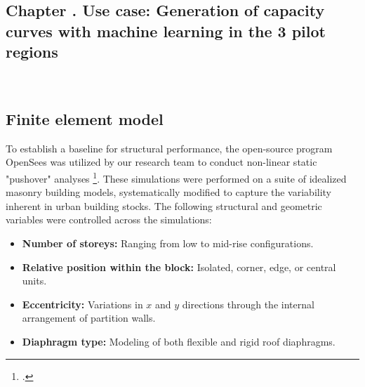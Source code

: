 \graphicspath{
    {figures_and_references/fragility_curves/}
    {figures_and_references/EELISA_conference/}
}

\renewcommand{\chapternametext}{Chapter \thechapter . Use case: Generation of capacity curves with machine learning in the 3 pilot regions}
\renewcommand{\shortchapternametext}{Chapter \thechapter . Use case: Capacity curve generation}

\begin{refsection}

\chapter{\chapternametext}
\

\renewcommand{\headingtextL}{}
\renewcommand{\headingtextR}{\shortchapternametext}
\begingroup
 \flushbottom
 \setlength{\parskip}{0pt plus 1fil}%
 \localtableofcontents 
\endgroup
 
\begingroup
 \flushbottom
 \setlength{\parskip}{0pt plus 1fil}%
 \locallistoffigures
 \locallistoftables
\endgroup


\newpage

\setcounter{section}{0} 

\FloatBarrier

\renewcommand{\sectionnametext}{Finite element model}
\renewcommand{\headingtextL}{\shortchapternametext}
\renewcommand{\headingtextR}{\thesection. \sectionnametext}
\section{\sectionnametext}

To establish a baseline for structural performance, the open-source program OpenSees was utilized by our research team to conduct non-linear static "pushover" analyses \footcite{yepes-estrada_modeling_2017,jimenez-martinez_methodology_2024}. These simulations were performed on a suite of idealized masonry building models, systematically modified to capture the variability inherent in urban building stocks. The following structural and geometric variables were controlled across the simulations:

\begin{itemize}
    \item \textbf{Number of storeys:} Ranging from low to mid-rise configurations.
    \item \textbf{Relative position within the block:} Isolated, corner, edge, or central units.
    \item \textbf{Eccentricity:} Variations in $x$ and $y$ directions through the internal arrangement of partition walls.
    \item \textbf{Diaphragm type:} Modeling of both flexible and rigid roof diaphragms.
\end{itemize}


\end{refsection}
